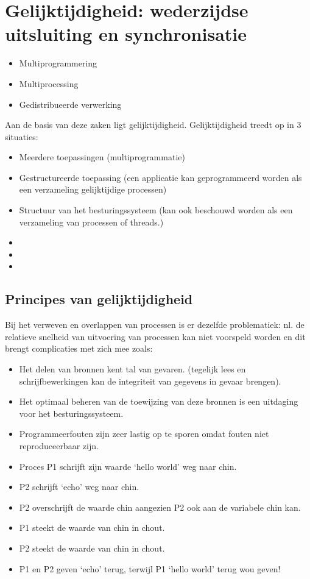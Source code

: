 \section{Gelijktijdigheid: wederzijdse uitsluiting en synchronisatie}

\begin{itemize}
\item Multiprogrammering
\item Multiprocessing
\item Gedistribueerde verwerking
\end{itemize}

Aan de basis van deze zaken ligt gelijktijdigheid. Gelijktijdigheid treedt op in 3 situaties:

\begin{itemize}
\item Meerdere toepassingen (multiprogrammatie)
\item Gestructureerde toepassing (een applicatie kan geprogrammeerd worden als een verzameling gelijktijdige processen)
\item Structuur van het besturingssysteem (kan ook beschouwd worden als een verzameling van processen of threads.)
\item 
\item 
\item 
\end{itemize}

\subsection{Principes van gelijktijdigheid}

Bij het verweven en overlappen van processen is er dezelfde problematiek: nl. de relatieve snelheid van uitvoering van processen kan niet voorspeld worden en dit brengt complicaties met zich mee zoals:

\begin{itemize}
\item Het delen van bronnen kent tal van gevaren. (tegelijk lees en schrijfbewerkingen kan de integriteit van gegevens in gevaar brengen).
\item Het optimaal beheren van de toewijzing van deze bronnen is een uitdaging voor het besturingssysteem.
\item Programmeerfouten zijn zeer lastig op te sporen omdat fouten niet reproduceerbaar zijn.
\end{itemize}

\begin{itemize}
\item Proces P1 schrijft zijn waarde ‘hello world’ weg naar chin.
\item P2 schrijft ‘echo’ weg naar chin.
\item P2 overschrijft de waarde chin aangezien P2 ook aan de variabele chin kan.
\item P1 steekt de waarde van chin in chout.
\item P2 steekt de waarde van chin in chout.
\item P1 en P2 geven ‘echo’ terug, terwijl P1 ‘hello world’ terug wou geven!
\end{itemize}

